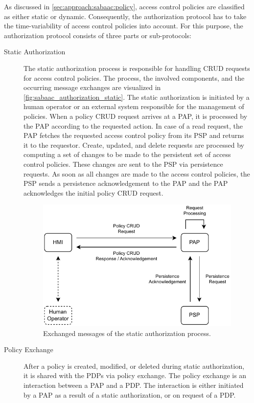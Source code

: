 As discussed in \autoref{sec:approach:sabaac:policy}, access control policies are classified as either static or dynamic.
Consequently, the authorization protocol has to take the time-variability of access control policies into account.
For this purpose, the authorization protocol consists of three parts or sub-protocols:
\begin{description}
    \item[Static Authorization] The static authorization process is responsible for handling CRUD requests for access control policies.
    The process, the involved components, and the occurring message exchanges are visualized in \autoref{fig:sabaac_authorization_static}.
    The static authorization is initiated by a human operator or an external system responsible for the management of policies.
    When a policy CRUD request arrives at a PAP, it is processed by the PAP according to the requested action.
    In case of a read request, the PAP fetches the requested access control policy from its PSP and returns it to the requestor.
    Create, updated, and delete requests are processed by computing a set of changes to be made to the persistent set of access control policies.
    These changes are sent to the PSP via persistence requests.
    As soon as all changes are made to the access control policies, the PSP sends a persistence acknowledgement to the PAP and the PAP acknowledges the initial policy CRUD request.
    \begin{figure}
        \centering
        \includegraphics[width=0.9\linewidth]{figures/SABAAC_protocols_authorization_static.drawio.pdf}
        \caption{Exchanged messages of the static authorization process.
        }
        \label{fig:sabaac_authorization_static}
    \end{figure}
    \item[Policy Exchange] After a policy is created, modified, or deleted during static authorization, it is shared with the PDPs via policy exchange.
    The policy exchange is an interaction between a PAP and a PDP.
    The interaction is either initiated by a PAP as a result of a static authorization, or on request of a PDP.


\end{description}
